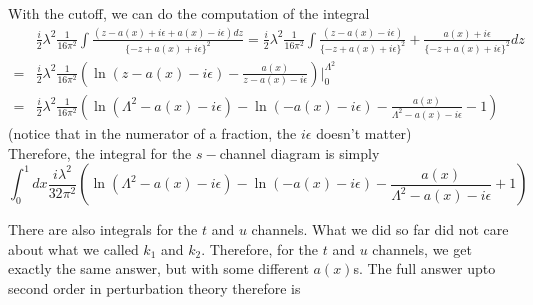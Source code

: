 \documentclass[11pt]{article}
\numberwithin{equation}{section}
\begin{document}
With the cutoff, we can do the computation of the integral 
\begin{align*}
    &\frac{i}{2}\lambda^2  \frac{1}{16\pi^2}\int  \frac{(z -a(x) + i\epsilon +a(x)-i\epsilon) dz}{\{-z + a(x) + i\epsilon\}^2} = \frac{i}{2}\lambda^2  \frac{1}{16\pi^2}\int  \frac{(z -a(x)-i\epsilon)}{\{-z + a(x) + i\epsilon\}^2} + \frac{a(x) +i\epsilon}{\{-z + a(x) + i\epsilon\}^2} dz\\
    =& \frac{i}{2}\lambda^2  \frac{1}{16\pi^2} \left( \ln (z-a(x) -i\epsilon) - \frac{a(x)}{z-a(x) - i\epsilon} \right)\bigg|_0^{\Lambda^2}\\
    =&\frac{i}{2}\lambda^2  \frac{1}{16\pi^2} \left( \ln \left(\Lambda^2-a(x) - i\epsilon \right) - \ln (-a(x) -i\epsilon) - \frac{a(x)}{\Lambda^2-a(x) - i\epsilon} - 1 \right)
\end{align*}
(notice that in the numerator of a fraction, the \(i\epsilon\) doesn't matter)\\

Therefore, the integral for the \(s-\)channel diagram is simply 
\begin{equation*}
    \int_0^1 dx  \frac{i\lambda^2 }{32\pi^2} \left( \ln \left(\Lambda^2-a(x) - i\epsilon \right) - \ln (-a(x) -i\epsilon) - \frac{a(x)}{\Lambda^2-a(x) - i\epsilon} + 1 \right)
\end{equation*}

There are also integrals for the \(t\) and \(u\) channels. What we did so far did not care about what we called \(k_1\) and \(k_2\). Therefore, for the \(t\) and \(u\) channels, we get exactly the same answer, but with some different \(a(x)\)s. The full answer upto second order in perturbation theory therefore is 
\end{document}
